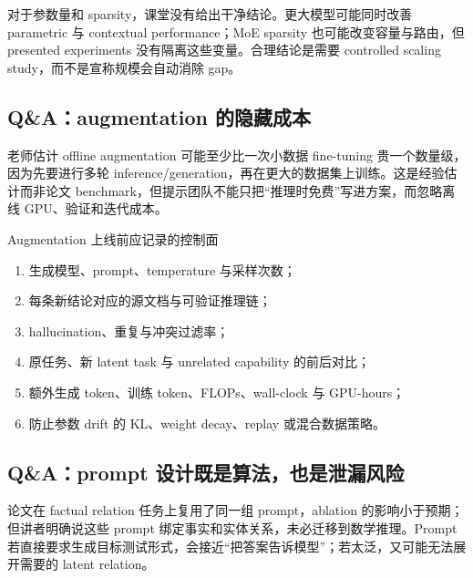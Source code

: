 对于参数量和 sparsity，课堂没有给出干净结论。更大模型可能同时改善 parametric 与 contextual performance；MoE sparsity 也可能改变容量与路由，但 presented experiments 没有隔离这些变量。合理结论是需要 controlled scaling study，而不是宣称规模会自动消除 gap。

\subsection{Q\&A：augmentation 的隐藏成本}

老师估计 offline augmentation 可能至少比一次小数据 fine-tuning 贵一个数量级，因为先要进行多轮 inference/generation，再在更大的数据集上训练。这是经验估计而非论文 benchmark，但提示团队不能只把“推理时免费”写进方案，而忽略离线 GPU、验证和迭代成本。


\begin{knowledgebox}{Augmentation 上线前应记录的控制面}
\begin{enumerate}
  \item 生成模型、prompt、temperature 与采样次数；
  \item 每条新结论对应的源文档与可验证推理链；
  \item hallucination、重复与冲突过滤率；
  \item 原任务、新 latent task 与 unrelated capability 的前后对比；
  \item 额外生成 token、训练 token、FLOPs、wall-clock 与 GPU-hours；
  \item 防止参数 drift 的 KL、weight decay、replay 或混合数据策略。
\end{enumerate}
\end{knowledgebox}

\subsection{Q\&A：prompt 设计既是算法，也是泄漏风险}

论文在 factual relation 任务上复用了同一组 prompt，ablation 的影响小于预期；但讲者明确说这些 prompt 绑定事实和实体关系，未必迁移到数学推理。Prompt 若直接要求生成目标测试形式，会接近“把答案告诉模型”；若太泛，又可能无法展开需要的 latent relation。


